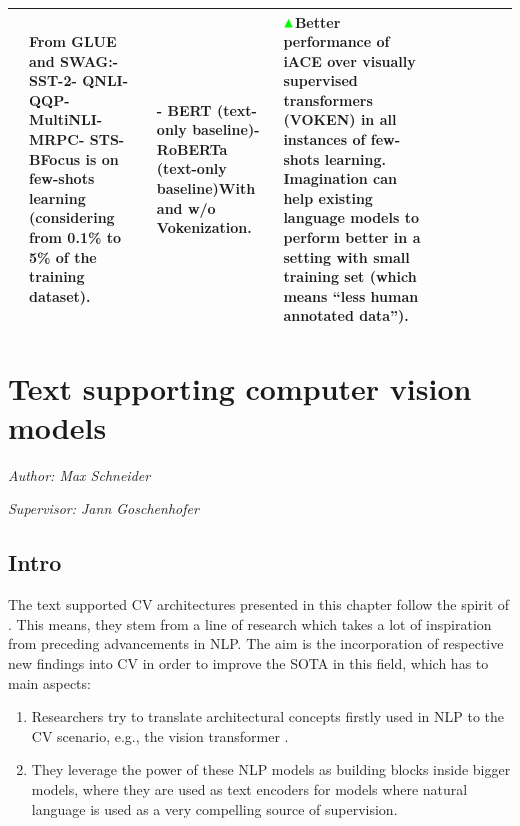 \documentclass[
]{krantz}
\providecommand{\tightlist}{%
  \setlength{\itemsep}{0pt}\setlength{\parskip}{0pt}}
\begin{document}
\begin{longtable}[]{@{}llllllllll@{}}
\begin{minipage}[t]{0.25\columnwidth}
\end{minipage} & \begin{minipage}[t]{0.08\columnwidth}\raggedright
From GLUE and SWAG:- SST-2- QNLI- QQP- MultiNLI- MRPC- STS-BFocus is on few-shots learning (considering from 0.1\% to 5\% of the training dataset).\strut
\end{minipage} & \begin{minipage}[t]{0.05\columnwidth}\raggedright
- BERT (text-only baseline)- RoBERTa (text-only baseline)With and w/o Vokenization.\strut
\end{minipage} & \begin{minipage}[t]{0.13\columnwidth}\raggedright
\(\color{green}\blacktriangle\)Better performance of iACE over visually supervised transformers (VOKEN) in all instances of few-shots learning. Imagination can help existing language models to perform better in a setting with small training set (which means ``less human annotated data'').\strut
\end{minipage}\tabularnewline
\bottomrule
\end{longtable}

\hypertarget{text-supporting-computer-vision-models}{%
\section{Text supporting computer vision models}\label{text-supporting-computer-vision-models}}

\emph{Author: Max Schneider}

\emph{Supervisor: Jann Goschenhofer}

\hypertarget{intro}{%
\subsection{Intro}\label{intro}}

The text supported CV architectures presented in this chapter follow the spirit of .
This means, they stem from a line of research which takes a lot of inspiration from preceding advancements in NLP.
The aim is the incorporation of respective new findings into CV in order to improve the SOTA in this field, which has to main aspects:

\begin{enumerate}
\def\labelenumi{\arabic{enumi}.}
\tightlist
\item
  Researchers try to translate architectural concepts firstly used in NLP to the CV scenario, e.g., the vision transformer .
\item
  They leverage the power of these NLP models as building blocks inside bigger models, where they are used as text encoders for models where natural language is used as a very compelling source of supervision.
\end{enumerate}
\end{document}
